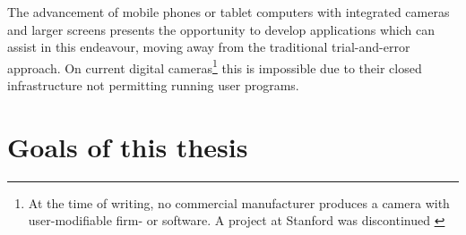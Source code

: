 The advancement of mobile phones or tablet computers with integrated cameras and
larger screens
presents the opportunity to develop applications which can assist in this
endeavour, moving away from the traditional trial-and-error approach.
On current digital cameras\footnote{At the time of writing, no commercial
manufacturer produces a camera with user-modifiable firm- or software. A project
at Stanford \citep{Levoy2010} was discontinued \cite{FrankenCam}} this is impossible due to their closed
infrastructure not permitting running user programs. 

\section{Goals of this thesis}


